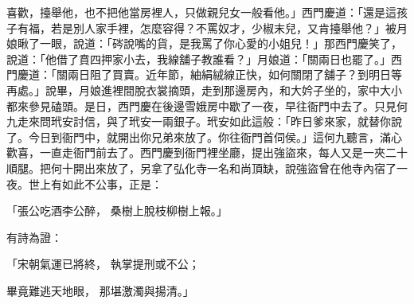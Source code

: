喜歡，擡舉他，也不把他當房裡人，只做親兒女一般看他。」西門慶道：「還是這孩子有福，若是別人家手裡，怎麼容得？不罵奴才，少椒末兒，又肯擡舉他？」被月娘瞅了一眼，說道：「硶說嘴的貨，是我罵了你心愛的小姐兒！」那西門慶笑了，說道：「他借了賁四押家小去，我線舖子教誰看？」月娘道：「關兩日也罷了。」西門慶道：「關兩日阻了買賣。近年節，紬絹絨線正快，如何關閉了舖子？到明日等再處。」說畢，月娘進裡間脫衣裳摘頭，走到那邊房內，和大妗子坐的，家中大小都來參見磕頭。是日，西門慶在後邊雪娥房中歇了一夜，早往衙門中去了。只見何九走來問玳安討信，與了玳安一兩銀子。玳安如此這般：「昨日爹來家，就替你說了。今日到衙門中，就開出你兄弟來放了。你往衙門首伺侯。」這何九聽言，滿心歡喜，一直走衙門前去了。西門慶到衙門裡坐廳，提出強盜來，每人又是一夾二十順腿。把何十開出來放了，另拿了弘化寺一名和尚頂缺，說強盜曾在他寺內宿了一夜。世上有如此不公事，正是：

「張公吃酒李公醉，  桑樹上脫枝柳樹上報。」

有詩為證：

「宋朝氣運已將終，  執掌提刑或不公；

畢竟難逃天地眼，  那堪激濁與揚清。」

